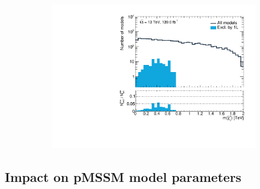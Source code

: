 \begin{figure}
\begin{subfigure}[b]{0.5\linewidth}
	\end{subfigure}\hfill
	\begin{subfigure}[b]{0.5\linewidth}
		\centering\includegraphics[width=\textwidth]{1D/m_chi_1p}
	\end{subfigure}\hfill
	\caption{}
	\label{fig:impact_electroweakinos_1D}
\end{figure}

\subsection{Impact on pMSSM model parameters}


